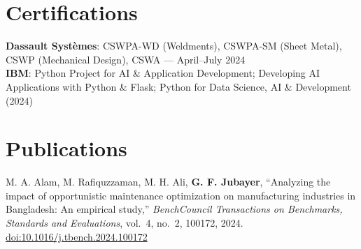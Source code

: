 \documentclass[letterpaper,11pt]{article}
\begin{document}
\section{Certifications}
 \begin{itemize}[leftmargin=0.15in, label={}]
    \small{\item{
     \textbf{Dassault Syst\`emes}: CSWPA-WD (Weldments), CSWPA-SM (Sheet Metal), CSWP (Mechanical Design), CSWA --- April--July 2024 \\
     \textbf{IBM}: Python Project for AI \& Application Development; Developing AI Applications with Python \& Flask; Python for Data Science, AI \& Development (2024)
    }}
 \end{itemize}

\section{Publications}
 \begin{itemize}[leftmargin=0.15in, label={}]
    \small{\item{
     M. A. Alam, M. Rafiquzzaman, M. H. Ali, \textbf{G. F. Jubayer}, ``Analyzing the impact of opportunistic maintenance optimization on manufacturing industries in Bangladesh: An empirical study,'' \textit{BenchCouncil Transactions on Benchmarks, Standards and Evaluations}, vol.~4, no.~2, 100172, 2024. \href{https://doi.org/10.1016/j.tbench.2024.100172}{doi:10.1016/j.tbench.2024.100172}
    }}
 \end{itemize}
\end{document}
